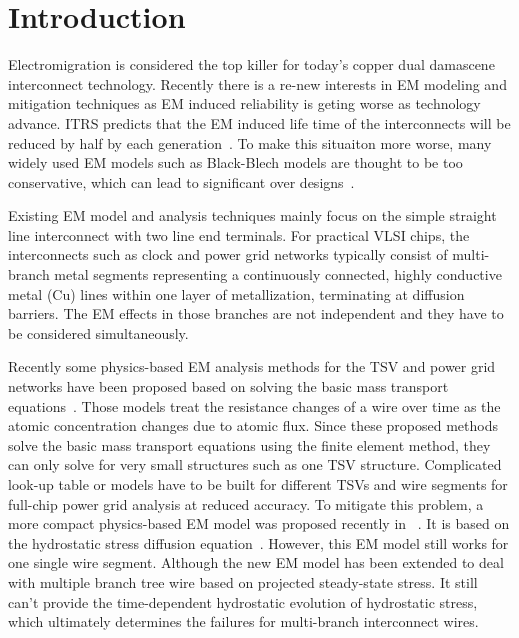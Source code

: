\section{Introduction}
\label{sec:intro}

Electromigration is considered the top killer for today's copper dual
damascene interconnect technology. Recently there is a re-new
interests in EM modeling and mitigation techniques as EM induced
reliability is geting worse as technology advance.  ITRS predicts that
the EM induced life time of the interconnects will be reduced by half
by each generation~\cite{ITRS}. To make this situaiton more worse,
many widely used EM models such as Black-Blech models are thought to
be too conservative, which can lead to significant over
designs~\cite{Bailey:semieng}.

Existing EM model and analysis techniques mainly focus on the simple
straight line interconnect with two line end terminals. For practical
VLSI chips, the interconnects such as clock and power grid networks
typically consist of multi-branch metal segments representing a
continuously connected, highly conductive metal (Cu) lines within one
layer of metallization, terminating at diffusion barriers. The EM
effects in those branches are not independent and they have to be
considered simultaneously.

Recently some physics-based EM analysis methods for the TSV and power
grid networks have been proposed based on solving the basic mass
transport
equations~\cite{Pak:2011cx,Pathak:2011kz,Zhao:2013cv,Pak:2013bh}.
Those models treat the resistance changes of a wire over time as the
atomic concentration changes due to atomic flux. Since these proposed
methods solve the basic mass transport equations using the finite
element method, they can only solve for very small structures such as
one TSV structure. Complicated look-up table or models have to be
built for different TSVs and wire segments for full-chip power grid
analysis at reduced accuracy. To mitigate this problem, a more compact
physics-based EM model was proposed recently in
~\cite{HuangYu:DAC'14}. It is based on the hydrostatic stress
diffusion equation~\cite{Korhonen:jap1993}. However, this EM model
still works for one single wire segment. Although the new EM model has
been extended to deal with multiple branch tree wire based on
projected steady-state stress.  It still can't provide the
time-dependent hydrostatic evolution of hydrostatic stress, which
ultimately determines the failures for multi-branch interconnect
wires.


